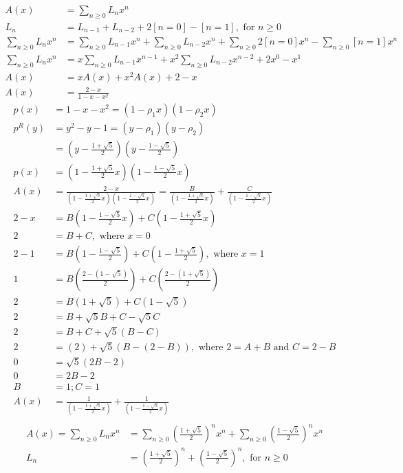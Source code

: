 	\begin{align*}
		A(x) &= \sum_{n\ge 0} L_n x^n\\
		L_n &= L_{n-1} + L_{n-2} +2[n=0] - [n=1], \text{ for } n\ge 0\\
		\sum_{n\ge 0} L_n x^n &= \sum_{n\ge 0} L_{n-1} x^n + \sum_{n\ge 0} L_{n-2} x^n + \sum_{n\ge 0} 2[n=0] x^n - \sum_{n\ge 0} [n=1] x^n\\
		\sum_{n\ge 0} L_n x^n &= x \sum_{n\ge 0} L_{n-1} x^{n-1} + x^2 \sum_{n\ge 0} L_{n-2} x^{n-2}+ 2 x^0 - x^1\\
		A(x) &= xA(x) + x^2A(x) + 2 - x\\
		A(x) &= \frac{2-x}{1-x-x^2}
\end{align*}
\begin{align*}
		p(x) &= 1-x-x^2 = (1-\rho_1x)(1-\rho_2x)\\
		p^R(y) &= y^2-y-1 = (y-\rho_1)(y-\rho_2)\\
		&= (y-\frac{1+\sqrt{5}}{2})(y-\frac{1-\sqrt{5}}{2})\\
		p(x) &= (1-\frac{1+\sqrt{5}}{2}x)(1-\frac{1-\sqrt{5}}{2}x)\\
		A(x) &= \frac{2-x}{(1-\frac{1+\sqrt{5}}{2}x)(1-\frac{1-\sqrt{5}}{2}x)}
		=\frac{B}{(1-\frac{1+\sqrt{5}}{2}x)}+\frac{C}{(1-\frac{1-\sqrt{5}}{2}x)}\\
		2-x &= B(1-\frac{1-\sqrt{5}}{2}x) + C(1-\frac{1+\sqrt{5}}{2}x)\\
		2&= B+C, \text{ where } x=0\\
		2-1 &= B(1-\frac{1-\sqrt{5}}{2}) + C(1-\frac{1+\sqrt{5}}{2}), \text{ where } x=1\\
		1 &= B(\frac{2-(1-\sqrt{5})}{2}) + C(\frac{2-(1+\sqrt{5})}{2})\\
		2 &= B(1+\sqrt{5}) + C(1-\sqrt{5})\\
		2 &= B+\sqrt{5}B + C-\sqrt{5}C\\
		2 &= B+C + \sqrt{5}(B-C)\\
		2 &= (2) + \sqrt{5}(B-(2-B)), \text{ where } 2=A+B \text{ and } C=2-B\\
		0 &= \sqrt{5}(2B-2)\\
		0 &= 2B-2\\
		B &= 1; C =1\\
		A(x) &=  \frac{1}{(1-\frac{1+\sqrt{5}}{2}x)}+\frac{1}{(1-\frac{1-\sqrt{5}}{2}x)}\\
\end{align*}
\begin{align*}
		A(x) = \sum_{n\ge 0} L_n x^n 
		&= \sum_{n\ge 0} (\frac{1+\sqrt{5}}{2})^nx^n + \sum_{n\ge 0} (\frac{1-\sqrt{5}}{2})^nx^n\\
		L_n &= (\frac{1+\sqrt{5}}{2})^n + (\frac{1-\sqrt{5}}{2})^n, \text{ for } n\ge 0
	\end{align*}
	
